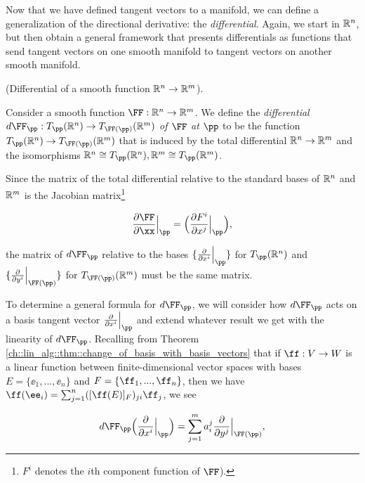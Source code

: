 Now that we have defined tangent vectors to a manifold, we can define a generalization of the directional derivative: the \textit{differential}. Again, we start in $\mathbb{R}^n$, but then obtain a general framework that presents differentials as functions that send tangent vectors on one smooth manifold to tangent vectors on another smooth manifold.

\begin{defn}
\label{ch::manifolds::defn::differential_smooth_function_Rn_Rm}
    (Differential of a smooth function $\mathbb{R}^n \rightarrow \mathbb{R}^m$).

    Consider a smooth function $\FF:\R^n \rightarrow \R^m$. We define the \textit{differential $d\FF_\pp:T_\pp(\R^n) \rightarrow T_{\FF(\pp)}(\R^m)$ of $\FF$ at $\pp$} to be the function $T_\pp(\R^n) \rightarrow T_{\FF(\pp)}(\R^m)$ that is induced by the total differential $\mathbb{R}^n \rightarrow \mathbb{R}^m$ and the isomorphisms $\R^n \cong T_\pp(\R^n), \R^m \cong T_\pp(\R^m)$.
    
    Since the matrix of the total differential relative to the standard bases of $\mathbb{R}^n$ and $\mathbb{R}^m$ is the Jacobian matrix\footnote{$F^i$ denotes the $i$th component function of $\FF$).}
    
    \begin{align*}
        \frac{\pd \FF}{\pd \xx}\Big|_\pp = \Big( \frac{\pd F^i}{\pd x^j}\Big|_\pp \Big),
    \end{align*}
    
    the matrix of $d\FF_\pp$ relative to the bases 
    $\{ \frac{\pd}{\pd x^i} \Big|_\pp \}$ for $T_\pp(\R^n)$ and $\{ \frac{\pd}{\pd y^i} \Big|_{\FF(\pp)} \}$ for $T_{\FF(\pp)}(\R^m)$ must be the same matrix.
    
    To determine a general formula for $d\FF_\pp$, we will consider how $d\FF_\pp$ acts on a basis tangent vector $\frac{\pd}{\pd x^i}\Big|_\pp$ and extend whatever result we get with the linearity of $d\FF_\pp$. Recalling from Theorem \ref{ch::lin_alg::thm::change_of_basis_with_basis_vectors} that if $\ff:V \rightarrow W$ is a linear function between finite-dimensional vector spaces with bases $E = \{\ee_1, ..., \ee_n\}$ and $F = \{\ff_1, ..., \ff_n\}$, then we have $\ff(\ee_i) = \sum_{j = 1}^n ([\ff(E)]_F)_{ji} \ff_j$, we see
    
    \begin{align*}
        d\FF_\pp \Big( \frac{\pd}{\pd x^i}\Big|_\pp \Big) 
        = \sum_{j = 1}^m a^j_i \frac{\pd}{\pd y^j}\Big|_{\FF(\pp)},
    \end{align*}
    

\end{defn}
